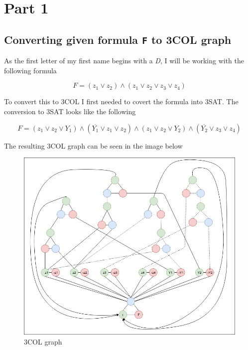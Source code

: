 \section{Part 1}

\subsection{Converting given formula \texttt{F} to 3COL graph}

As the first letter of my first name begins with a \textit{D}, I will be working with the following formula

\begin{equation} \label{eq:original-problem-formula}
F = (z_1 \lor z_2) \land (z_1 \lor z_2 \lor z_3 \lor z_4) 
\end{equation}

To convert this to 3COL I first needed to covert the formula into 3SAT. The conversion to 3SAT looks like the following

\begin{equation}\label{eq:3sat-original-formula}
F = (z_1 \lor z_2 \lor Y_1) \land (\overline{Y_1} \lor z_1 \lor z_2) \land (z_1 \lor z_2 \lor Y_2) \land(\overline{Y_2} \lor z_3 \lor z_4)
\end{equation}

The resulting 3COL graph can be seen in the image below

\begin{figure}[h!]
\vspace{-5pt}
\centering
\includegraphics[width=1.0\textwidth]{images/3col.jpg}
\caption{\label{fig:3col_graph}3COL graph}
\end{figure}

